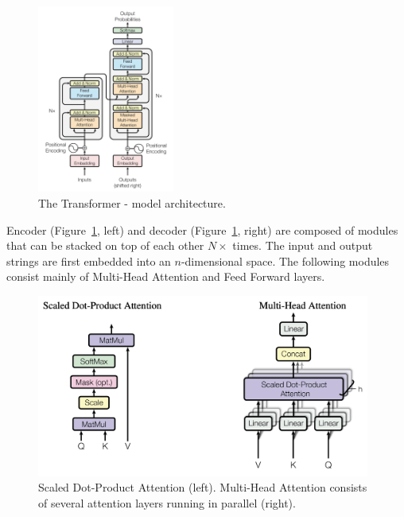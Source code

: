 \begin{figure}
  \begin{center}
    \includegraphics[width=0.4\textwidth]{figures/03_transformer_overview.png}
    \caption{The Transformer - model architecture. \cite{vaswani2017attention}}
    \label{fig:trans_arch}
  \end{center}
\end{figure}

Encoder (Figure~\ref{fig:trans_arch}, left) and decoder (Figure~\ref{fig:trans_arch}, right) are composed of modules that can be stacked on top of each other $N\times$ times. The input and output strings are first embedded into an $n$-dimensional space. The following modules consist mainly of Multi-Head Attention and Feed Forward layers. 

\begin{figure}[h] %
    \centering
    \includegraphics[height=60mm]{figures/03_blocks_overview.png} %
    \caption{Scaled Dot-Product Attention (left). Multi-Head Attention consists of several attention layers running in parallel (right). \cite{vaswani2017attention}} %
    \label{fig:trans_attn} %
\end{figure} 

